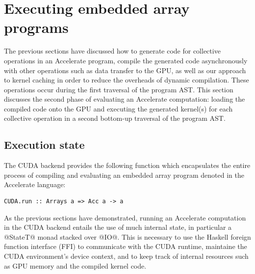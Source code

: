 \section{Executing embedded array programs}
\label{sec:executing_programs}

The previous sections have discussed how to generate code for collective
operations in an Accelerate program, compile the generated code asynchronously
with other operations such as data transfer to the GPU, as well as our approach
to kernel caching in order to reduce the overheads of dynamic compilation. These
operations occur during the first traversal of the program AST\@. This section
discusses the second phase of evaluating an Accelerate computation: loading the
compiled code onto the GPU and executing the generated kernel(s) for each
collective operation in a second bottom-up traversal of the program AST.

% 


\subsection{Execution state}

The CUDA backend provides the following function which encapsulates the entire
process of compiling and evaluating an embedded array program denoted in the
Accelerate language:
%
\begin{lstlisting}[style=haskell]
CUDA.run :: Arrays a => Acc a -> a
\end{lstlisting}
%
As the previous sections have demonstrated, running an Accelerate computation in
the CUDA backend entails the use of much internal state, in particular a
@StateT@ monad stacked over @IO@. This is necessary to use the Haskell
foreign function interface (FFI) to communicate with the CUDA runtime, maintaine
the CUDA environment's device context, and to keep track of internal resources
such as GPU memory and the compiled kernel code.

